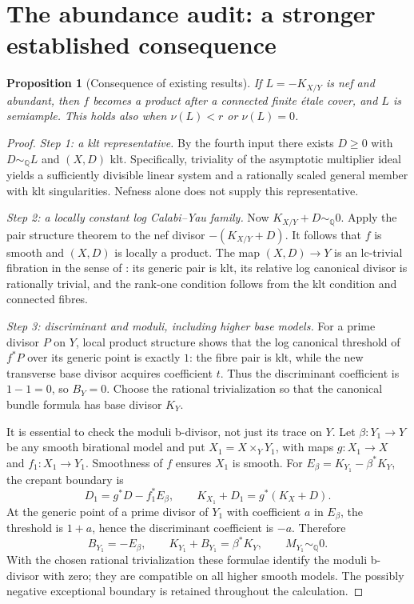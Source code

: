 \documentclass[12pt]{amsart}
\newtheorem{prop}[thm]{Proposition}
\theoremstyle{definition}
\theoremstyle{remark}
\numberwithin{equation}{section}
\newcommand{\Q}{\mathbb{Q}}
\begin{document}
\section{The abundance audit: a stronger established consequence}\label{en:auditproof}
\begin{prop}[Consequence of existing results]\label{en:abundant}
If $L=-K_{X/Y}$ is nef and abundant, then $f$ becomes a product after a connected finite \'etale cover, and $L$ is semiample. This holds also when $\nu(L)<r$ or $\nu(L)=0$.
\end{prop}
\begin{proof}
\textit{Step 1: a klt representative.}
By the fourth input there exists $D\geq0$ with $D\sim_\Q L$ and $(X,D)$ klt. Specifically, triviality of the asymptotic multiplier ideal yields a sufficiently divisible linear system and a rationally scaled general member with klt singularities. Nefness alone does not supply this representative.

\textit{Step 2: a locally constant log Calabi--Yau family.}
Now $K_{X/Y}+D\sim_\Q0$. Apply the pair structure theorem to the nef divisor $-(K_{X/Y}+D)$. It follows that $f$ is smooth and $(X,D)$ is locally a product. The map $(X,D)\to Y$ is an lc-trivial fibration in the sense of \cite{en:Amb}: its generic pair is klt, its relative log canonical divisor is rationally trivial, and the rank-one condition follows from the klt condition and connected fibres.

\textit{Step 3: discriminant and moduli, including higher base models.}
For a prime divisor $P$ on $Y$, local product structure shows that the log canonical threshold of $f^*P$ over its generic point is exactly $1$: the fibre pair is klt, while the new transverse base divisor acquires coefficient $t$. Thus the discriminant coefficient is $1-1=0$, so $B_Y=0$. Choose the rational trivialization so that the canonical bundle formula has base divisor $K_Y$.

It is essential to check the moduli b-divisor, not just its trace on $Y$. Let $\beta:Y_1\to Y$ be any smooth birational model and put $X_1=X\times_Y Y_1$, with maps $g:X_1\to X$ and $f_1:X_1\to Y_1$. Smoothness of $f$ ensures $X_1$ is smooth. For $E_\beta=K_{Y_1}-\beta^*K_Y$, the crepant boundary is
\[
 D_1=g^*D-f_1^*E_\beta,
 \qquad K_{X_1}+D_1=g^*(K_X+D).
\]
At the generic point of a prime divisor of $Y_1$ with coefficient $a$ in $E_\beta$, the threshold is $1+a$, hence the discriminant coefficient is $-a$. Therefore
\[
 B_{Y_1}=-E_\beta,\qquad
 K_{Y_1}+B_{Y_1}=\beta^*K_Y,\qquad M_{Y_1}\sim_\Q0.
\]
With the chosen rational trivialization these formulae identify the moduli b-divisor with zero; they are compatible on all higher smooth models. The possibly negative exceptional boundary is retained throughout the calculation.


\end{proof}
\end{document}
